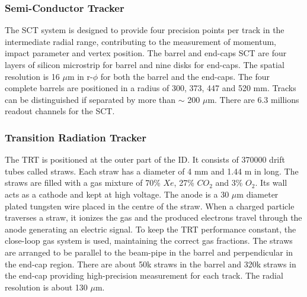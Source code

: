 \subsubsection{Semi-Conductor Tracker}
\label{chap2:ATLAS:ITK:SCT}
The SCT system is designed to provide four precision points per track in the intermediate radial range, contributing to the measurement of momentum, impact parameter and vertex position. The barrel and end-caps SCT are four layers of silicon microstrip for barrel and nine disks for end-caps. The spatial resolution is 16 $\mu$m in r-$\phi$ for both the barrel and the end-caps. The four complete barrels are positioned in a radius of 300, 373, 447 and 520 mm. Tracks can be distinguished if separated by more than $\sim$ 200 $\mu$m. There are 6.3 millions readout channels for the SCT.

\subsubsection{Transition Radiation Tracker}
The TRT is positioned at the outer part of the ID. It consists of 370000 drift tubes called straws. Each straw has a diameter of 4 mm and 1.44 m in long. The straws are filled with a gas mixture of 70\% $Xe$, 27\% $CO_2$ and 3\% $O_2$. Its wall acts as a cathode and kept at high voltage. The anode is a 30 $\mu$m diameter plated tungsten wire placed in the centre of the straw. When a charged particle traverses a straw, it ionizes the gas and the produced electrons travel through the anode generating an electric signal. To keep the TRT performance constant, the close-loop gas system is used, maintaining the correct gas fractions. The straws are arranged to be parallel to the beam-pipe in the barrel and perpendicular in the end-cap region. There are about 50k straws in the barrel and 320k straws in the end-cap providing high-precision measurement for each track. The radial resolution is about 130 $\mu$m. \\

